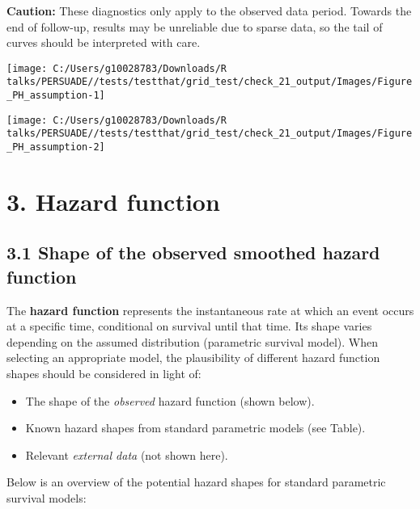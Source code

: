 \documentclass[
]{article}
\providecommand{\tightlist}{%
  \setlength{\itemsep}{0pt}\setlength{\parskip}{0pt}}
\begin{document}
\textbf{Caution:} These diagnostics only apply to the observed data
period. Towards the end of follow-up, results may be unreliable due to
sparse data, so the tail of curves should be interpreted with care.

\clearpage

\begin{flushleft}\texttt{[image: C:/Users/g10028783/Downloads/R talks/PERSUADE//tests/testthat/grid\_test/check\_21\_output/Images/Figure\_PH\_assumption-1]} \end{flushleft}

\begin{flushleft}\texttt{[image: C:/Users/g10028783/Downloads/R talks/PERSUADE//tests/testthat/grid\_test/check\_21\_output/Images/Figure\_PH\_assumption-2]} \end{flushleft}

\clearpage

\section{3. Hazard function}\label{hazard-function}

\subsection{3.1 Shape of the observed smoothed hazard
function}\label{shape-of-the-observed-smoothed-hazard-function}

The \textbf{hazard function} represents the instantaneous rate at which
an event occurs at a specific time, conditional on survival until that
time. Its shape varies depending on the assumed distribution (parametric
survival model). When selecting an appropriate model, the plausibility
of different hazard function shapes should be considered in light of:

\begin{itemize}
\tightlist
\item
  The shape of the \emph{observed} hazard function (shown below).
\item
  Known hazard shapes from standard parametric models (see Table).
\item
  Relevant \emph{external data} (not shown here).
\end{itemize}

Below is an overview of the potential hazard shapes for standard
parametric survival models:
\end{document}
